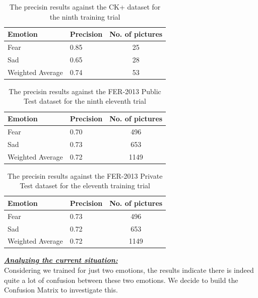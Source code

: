 \documentclass[runningheads,a4paper,11pt]{report}
\begin{document}
\begin{table}[htbp]
	\caption{The precisin results against the CK+ dataset for the ninth training trial}
	\label{sad_and_fear_fer_2013_01_mean_square_ckp}
		\begin{center}
			\begin{tabular}{p{110pt}p{110pt}c}
				\textbf{Emotion}& \textbf{Precision}& \textbf{No. of pictures} \\
				\hline\hline
				Fear& 0.85& 25 \\
				Sad& 0.65& 28 \\
				\hline
				Weighted Average& 0.74& 53
			\end{tabular}
		\end{center}
\end{table}
\begin{table}[htbp]
	\caption{The precisin results against the FER-2013 Public Test dataset for the ninth eleventh trial}
	\label{sad_and_fear_fer_2013_01_mean_square_public_test}
		\begin{center}
			\begin{tabular}{p{110pt}p{110pt}c}
				\textbf{Emotion}& \textbf{Precision}& \textbf{No. of pictures} \\
				\hline\hline
				Fear& 0.70& 496 \\
				Sad& 0.73& 653 \\
				\hline
				Weighted Average& 0.72 &1149
			\end{tabular}
		\end{center}
\end{table}
\begin{table}[htbp]
	\caption{The precisin results against the FER-2013 Private Test dataset for the eleventh training trial}
	\label{sad_and_fear_fer_2013_01_mean_square_private_test}
		\begin{center}
			\begin{tabular}{p{110pt}p{110pt}c}
				\textbf{Emotion}& \textbf{Precision}& \textbf{No. of pictures} \\
				\hline\hline
				Fear& 0.73& 496 \\
				Sad& 0.72& 653 \\
				\hline
				Weighted Average& 0.72 &1149
			\end{tabular}
		\end{center}
\end{table}

\clearpage
\underline{\textbf{\emph{Analyzing the current situation:}}}\\
Considering we trained for just two emotions, the results indicate there is indeed quite a lot of confusion between these two emotions. We decide to build the Confusion Matrix to investigate this.
\end{document}
